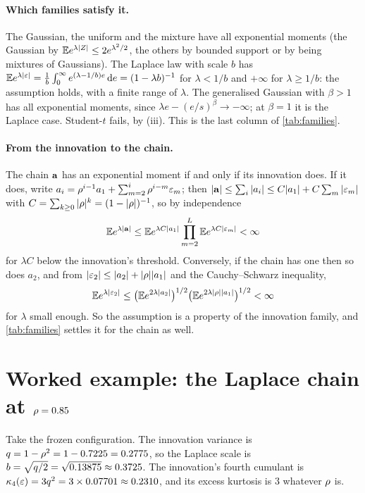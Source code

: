 \paragraph{Which families satisfy it.}
The Gaussian, the uniform and the mixture have all exponential moments (the Gaussian
by $\mathbb{E} e^{\lambda|Z|}\le2e^{\lambda^2/2}$, the others by bounded support or by being
mixtures of Gaussians). The Laplace law with scale $b$ has
$\mathbb{E} e^{\lambda|\varepsilon|}=\tfrac1b\int_0^\infty e^{(\lambda-1/b)e}\,\mathrm{d} e=(1-\lambda b)^{-1}$
for $\lambda<1/b$ and $+\infty$ for $\lambda\ge1/b$: the assumption holds, with a
finite range of $\lambda$. The generalised Gaussian with $\beta>1$ has all exponential
moments, since $\lambda e-(e/s)^\beta\to-\infty$; at $\beta=1$ it is the Laplace case.
Student-$t$ fails, by (iii). This is the last column of \cref{tab:families}.

\paragraph{From the innovation to the chain.}
The chain $\mathbf{a}$ has an exponential moment if and only if its innovation does. If it
does, write $a_i=\rho^{i-1}a_1+\sum_{m=2}^i\rho^{i-m}\varepsilon_m$; then
$|\mathbf{a}|\le\sum_i|a_i|\le C|a_1|+C\sum_m|\varepsilon_m|$ with $C=\sum_{k\ge0}|\rho|^k=(1-|\rho|)^{-1}$,
so by independence
\[
  \mathbb{E} e^{\lambda|\mathbf{a}|}\le\mathbb{E} e^{\lambda C|a_1|}\prod_{m=2}^{L}\mathbb{E} e^{\lambda C|\varepsilon_m|}<\infty
\]
for $\lambda C$ below the innovation's threshold. Conversely, if the chain has one
then so does $a_2$, and from $|\varepsilon_2|\le|a_2|+|\rho||a_1|$ and the
Cauchy--Schwarz inequality,
\[
  \mathbb{E} e^{\lambda|\varepsilon_2|}\le\bigl(\mathbb{E} e^{2\lambda|a_2|}\bigr)^{1/2}\bigl(\mathbb{E} e^{2\lambda|\rho||a_1|}\bigr)^{1/2}<\infty
\]
for $\lambda$ small enough. So the assumption is a property of the innovation family,
and \cref{tab:families} settles it for the chain as well.

\section{Worked example: the Laplace chain at $\rho=0.85$}

Take the frozen configuration. The innovation variance is
$q=1-\rho^2=1-0.7225=0.2775$, so the Laplace scale is
$b=\sqrt{q/2}=\sqrt{0.13875}\approx0.3725$. The innovation's fourth cumulant is
$\kappa_4(\varepsilon)=3q^2=3\times0.07701\approx0.2310$, and its excess kurtosis
is $3$ whatever $\rho$ is.

